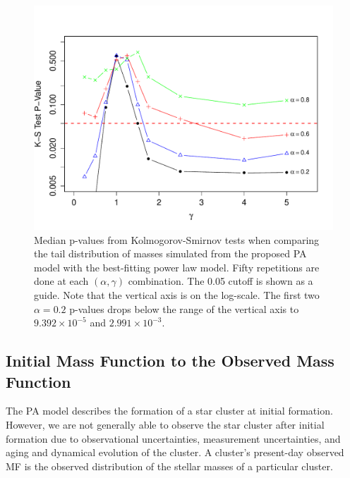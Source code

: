 \documentclass[ejs]{imsart}
\numberwithin{equation}{section}
\theoremstyle{plain}
\begin{document}
\begin{figure}[htbp]
   \centering
\includegraphics[width = \textwidth]{figures/KSpowerlaw_1000_1.pdf}
\caption{Median p-values from Kolmogorov-Smirnov tests when comparing the tail distribution of masses simulated from
the proposed PA model with the best-fitting power law model. Fifty repetitions are done at each $(\alpha, \gamma)$
combination. The 0.05 cutoff is shown as a guide. Note that the vertical axis is on the log-scale.
The first two $\alpha = 0.2$ p-values drops below the range of the vertical axis to $9.392\times10^{-5}$ and $2.991\times10^{-3}$.
}
   \label{fig:KSpowerlaw1000}
\end{figure}



\subsection{Initial Mass Function to the Observed Mass Function} \label{sec:obs_challenges}
The PA model describes the formation of a star cluster at initial formation.  However, we are not generally able to observe the star cluster after initial formation due to observational uncertainties, measurement uncertainties, and aging and dynamical evolution of the cluster.  A cluster's present-day observed MF is the observed distribution of the stellar masses of a particular cluster.
\end{document}
